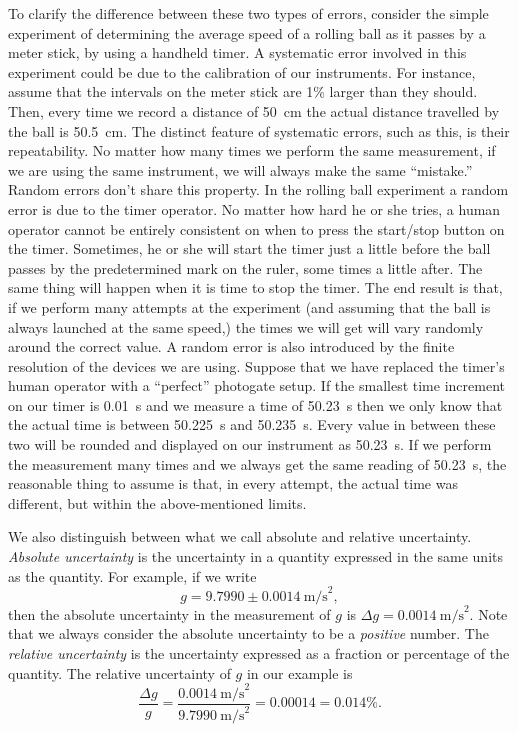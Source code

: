 To clarify the difference between these two types of errors, consider the
simple experiment of determining the average speed of a rolling ball as it
passes by a meter stick, by using a handheld timer. A systematic error
involved in this experiment could be due to the calibration of our instruments.
For instance, assume that the intervals on the meter stick are 1\% larger than
they should. Then, every time we record a distance of 50~cm the actual distance
travelled by the ball is 50.5~cm. The distinct feature of systematic errors,
such as this, is their repeatability. No matter how many times we perform the
same measurement, if we are using the same instrument, we will always make the
same ``mistake.'' Random errors don't share this property. In the rolling ball
experiment a random error is due to the timer operator. No matter how hard he
or she tries, a human operator cannot be entirely consistent on when to press
the start/stop button on the timer. Sometimes, he or she will start the timer
just a little before the ball passes by the predetermined mark on the ruler,
some times a little after. The same thing will happen when it is time to stop
the timer. The end result is that, if we perform many attempts at the
experiment (and assuming that the ball is always launched at the same speed,)
the times we will get will vary randomly around the correct value. A random
error is also introduced by the finite resolution of the devices we are using.
Suppose that we have replaced the timer's human operator with a ``perfect''
photogate setup. If the smallest time increment on our timer is 0.01~s and we
measure a time of 50.23~s then we only know that the actual time is between
50.225~s and 50.235~s. Every value in between these two will be rounded and
displayed on our instrument as 50.23~s. If we perform the measurement many
times and we always get the same reading of 50.23~s, the reasonable thing to
assume is that, in every attempt, the actual time was different, but
within the above-mentioned limits.

We also distinguish between what we call absolute and relative uncertainty.
{\it Absolute uncertainty} is the uncertainty in a quantity expressed in the 
same units as the quantity. For example, if we write
$$ g = 9.7990\pm 0.0014~\mbox{m/s}^2,$$ 
then the absolute uncertainty in the measurement of $g$ is 
$\Delta g=0.0014~\mbox{m/s}^2$.  Note that we always consider the absolute 
uncertainty to be a {\it positive} number. The {\it relative uncertainty} is 
the uncertainty expressed as a fraction or percentage of the quantity.  The 
relative uncertainty of $g$ in our example is 
$$ \frac{\Delta g}{g} = \frac{0.0014~\mbox{m/s}^2}{9.7990~\mbox{m/s}^2}
= 0.00014 = 0.014\%.$$ 

